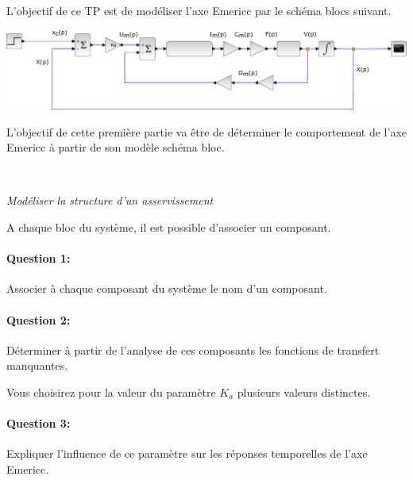 

\ifdef{\public}{\cleardoublepage}{}



L'objectif de ce TP est de modéliser l'axe Emericc par le schéma blocs suivant.

\begin{center}
 \includegraphics[width=0.95\linewidth]{img/Emericc}
\end{center}

L'objectif de cette première partie va être de déterminer le comportement de l'axe Emericc à partir de son modèle schéma bloc.

~\

\textit{Modéliser la structure d'un asservissement}

A chaque bloc du système, il est possible d'associer un composant.

\paragraph{Question 1:} Associer à chaque composant du système le nom d'un composant.

\paragraph{Question 2:} Déterminer à partir de l'analyse de ces composants les fonctions de transfert manquantes.

Vous choisirez pour la valeur du paramètre $K_a$ plusieurs valeurs distinctes.

\paragraph{Question 3:} Expliquer l'influence de ce paramètre sur les réponses temporelles de l'axe Emericc.

\ifdef{\public}{\cleardoublepage}{}


